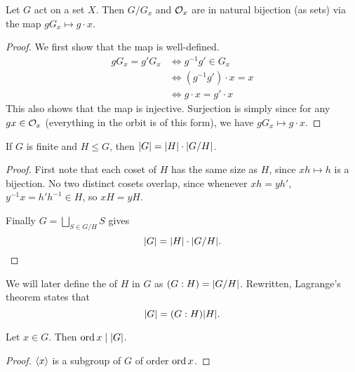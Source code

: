 
\begin{theorem*} \label{thm:orbit-stab}
    Let $G$ act on a set $X$.
    Then $G/G_x$ and $\mathcal{O}_x$ are in natural bijection (as sets)
    via the map $gG_x \mapsto g \cdot x$.
\end{theorem*}
\begin{proof}
    We first show that the map is well-defined.
    \begin{align*}
        g G_x = g' G_x &\iff g^{-1} g' \in G_x \\
            &\iff (g^{-1} g') \cdot x = x \\
            &\iff g \cdot x = g' \cdot x
    \end{align*}
    This also shows that the map is injective.
    Surjection is simply since for any $gx \in \mathcal{O}_x$
    (everything in the orbit is of this form), we have $gG_x \mapsto g \cdot x$.
\end{proof}

\begin{theorem*} \label{thm:lagrange}
    If $G$ is finite and $H \le G$,
    then $\lvert G\rvert = \lvert H\rvert \cdot \lvert G/H\rvert$.
\end{theorem*}
\begin{proof}
    First note that each coset of $H$ has the same size as $H$,
    since $xh \mapsto h$ is a bijection.
    No two distinct cosets overlap, since whenever $xh = yh'$,
    $y^{-1} x = h' h^{-1} \in H$, so $xH = yH$.

    Finally $G = \bigsqcup_{S \in G/H} S$ gives \[
        \lvert G\rvert = \lvert H\rvert \cdot \lvert G/H\rvert. \qedhere
    \]
\end{proof}
We will later define the  of $H$ in $G$ as
$(G : H) = \lvert G/H\rvert$.
Rewritten, Lagrange's theorem states that \[
    \lvert G\rvert = (G : H) \lvert H\rvert.
\]

\begin{corollary}
    Let $x \in G$.
    Then $\operatorname{ord} x \mid \lvert G\rvert$.
\end{corollary}
\begin{proof}
    $\langle x\rangle$ is a subgroup of $G$ of order $\operatorname{ord} x$.
\end{proof}

